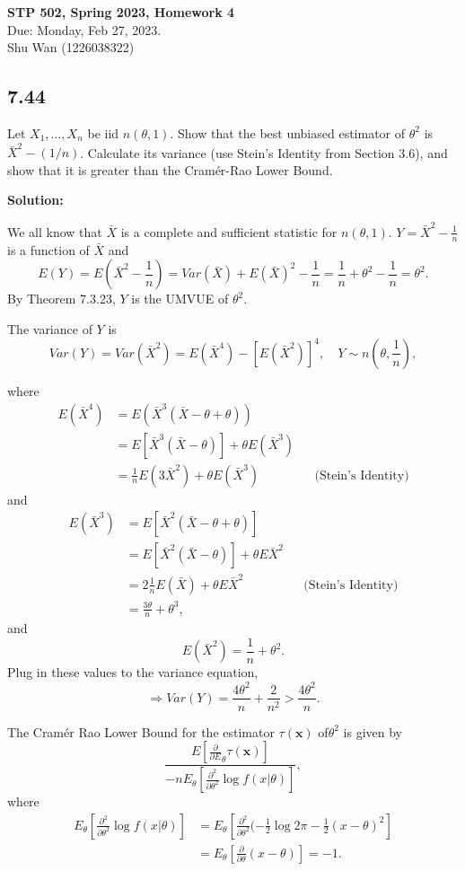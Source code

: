 \documentclass[11pt]{article}
\newcommand{\x}{\mathbf{x}}
\newcommand{\Sol}{\par {\bf Solution:}}
\newcommand{\sample}[1]{#1_1 , \dots , #1_n}
\newcommand{\Partial}[1]{\frac{\partial}{\partial #1}}
\newcommand{\SecPartial}[1]{\frac{\partial^2}{\partial {#1}^2}}
\begin{document}
\begin{center}
\Large{
\textbf{STP 502, Spring 2023, Homework 4} \\
Due: Monday, Feb 27, 2023. \\
Shu Wan (1226038322)
}
\end{center}
\subsection*{7.44}
Let $\sample{X}$ be iid $n(\theta, 1)$. Show that the best unbiased estimator of $\theta^2$ is $\bar X^2 - (1/ n)$.
Calculate its variance (use Stein's Identity from Section 3.6), and show that it is greater than the Cram\'{e}r-Rao Lower Bound.

\Sol

We all know that $\bar X$ is a complete and sufficient statistic for $n(\theta, 1)$. $Y = \bar X^2 - \frac{1}{n}$ is a function of $\bar X$ and 
\[
E(Y) = E(\bar X^2 - \frac{1}{n}) =  Var(\bar X) + E(\bar X)^2 - \frac{1}{n} = \frac{1}{n} + \theta^2 - \frac{1}{n} = \theta^2.
\]
By Theorem 7.3.23, $Y$ is the UMVUE of $\theta^2$.

The variance of $Y$ is 
\[
Var(Y) = Var(\bar X^2) = E(\bar X^4) - [E(\bar X^2)]^4, \quad Y \sim n(\theta, \frac{1}{n}),
\]

where
\begin{align*}
    E(\bar X^4) &= E(\bar X^3(\bar X - \theta + \theta)) \\
    &= E[\bar X^3 (\bar X - \theta)] + \theta E(\bar X^3) \\
    &= \frac{1}{n}E(3 \bar X^2) + \theta E(\bar X^3) && \text{(Stein's Identity)}
\end{align*}
and
\begin{align*}
E(\bar X^3) &= E[\bar X^2(\bar X - \theta + \theta)] \\
&= E[\bar X^2 (\bar X - \theta)] + \theta E\bar X^2 \\
&= 2\frac{1}{n}E(\bar X) + \theta E\bar X^2 && \text{(Stein's Identity)} \\
&= \frac{3\theta}{n} + \theta^3,
\end{align*}
and
\[
E(\bar X^2) = \frac{1}{n} + \theta^2.
\]
Plug in these values to the variance equation,
\[
\Longrightarrow Var(Y) =  \frac{4\theta^2}{n} + \frac{2}{n^2} > \frac{4\theta^2}{n}.
\]

The Cram\'{e}r Rao Lower Bound for the estimator $\tau(\x)$ of$\theta^2$ is given by
\[
\frac{E [\Partial E_\theta \tau(\x)]}{-nE_\theta [\SecPartial{\theta} \log f(x|\theta)]},
\]
where
\begin{align*}
    E_\theta [\SecPartial{\theta} \log f(x|\theta)] &= E_\theta [\SecPartial{\theta} (-\frac{1}{2} \log 2\pi - \frac{1}{2}(x-\theta)^2] \\
    &= E_\theta[\Partial \theta (x-\theta)] = -1.
\end{align*}
\end{document}
